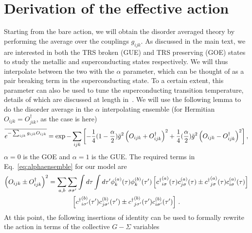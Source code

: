 \section{Derivation of the effective action}
\label{app:effectiveaction}
%
Starting from the bare action, we will obtain the disorder averaged theory by performing the average over the couplings $g_{ijk}$. As discussed in the main text, we are interested in both the TRS broken (GUE) and TRS preserving (GOE) states to study the metallic and superconducting states respectively. We will thus interpolate between the two with the $\alpha$ parameter, which can be thought of as a pair breaking term in the superconducting state. To a certain extent, this parameter can also be used to tune the superconducting transition temperature, details of which are discussed at length in~\cite{classen2021superconductivity}. 
%
We will use the following lemma to do the disorder average in the $\alpha$ interpolating ensemble (for Hermitian $O_{ijk} = O^\dagger_{jik}$, as the case is here)
\begin{equation}
    \overline{e^{-\sum_{ijk} g_{ijk}O_{ijk}}} = \exp{-\sum_{ijk}\left[-\frac{1}{4}(1-\frac{\alpha}{2})\Bar{g}^2\left(O_{ijk} + O^\dagger_{ijk}\right)^2 + \frac{1}{4}(\frac{\alpha}{2})\Bar{g}^2\left(O_{ijk} - O^\dagger_{ijk}\right)^2\right]} \, ,
    \label{eq:alphaensemble}
\end{equation}
$\alpha = 0$ is the GOE and $\alpha=1$ is the GUE.  
%
The required terms in Eq.~\eqref{eq:alphaensemble} for our model are
\begin{multline}
    \left(O_{ijk} \pm O^\dagger_{ijk}\right)^2 = \sum_{a,b}\sum_{\sigma\sigma^\prime}\int d\tau\int d\tau^\prime \phi^{(a)}_{k}(\tau)\phi^{(b)}_{k}(\tau^\prime)\left[{c^\dagger}^{(a)}_{i\sigma}(\tau)c^{(a)}_{j\sigma}(\tau)\pm {c^\dagger}^{(a)}_{j\sigma}(\tau)c^{(a)}_{i\sigma}(\tau)\right]\\\left[{c^\dagger}^{(b)}_{i\sigma^\prime}(\tau^\prime)c^{(b)}_{j\sigma^\prime}(\tau^\prime)\pm {c^\dagger}^{(b)}_{j\sigma^\prime}(\tau^\prime)c^{(b)}_{i\sigma^\prime}(\tau^\prime)\right] \, .
    \label{eq:OpmO+}
\end{multline}
%
At this point, the following insertions of identity can be used to formally rewrite the action in terms of the collective $G-\Sigma$ variables~\cite{inkof2022thesis,valentinis2023correlation}
%

